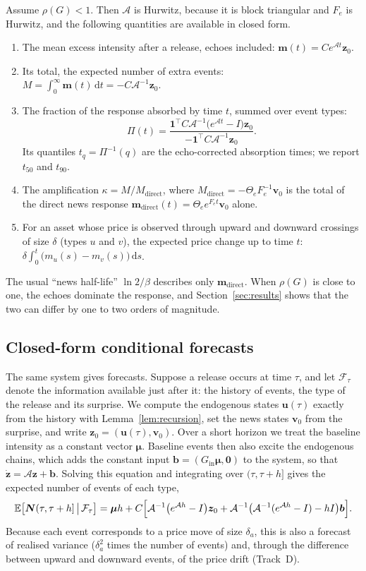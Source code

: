 \begin{corollary}\label{cor:abs}
Assume $\rho(G)<1$. Then $\mathcal A$ is Hurwitz, because it is block triangular and $F_e$ is
Hurwitz, and the following quantities are available in closed form.
\begin{enumerate}
\item The mean excess intensity after a release, echoes included: $\bm m(t)=Ce^{\mathcal At}\bm z_0$.
\item Its total, the expected number of extra events: $M=\int_0^\infty\bm m(t)\,\mathrm{d}t=-C\mathcal A^{-1}\bm z_0$.
\item The fraction of the response absorbed by time $t$, summed over event types:
\[
\Pi(t)=\frac{\bm 1^\top C\mathcal A^{-1}\bigl(e^{\mathcal At}-I\bigr)\bm z_0}{-\bm 1^\top C\mathcal A^{-1}\bm z_0}.
\]
Its quantiles $t_q=\Pi^{-1}(q)$ are the echo-corrected absorption times; we report $t_{50}$ and $t_{90}$.
\item The amplification $\kappa=M/M_{\mathrm{direct}}$, where $M_{\mathrm{direct}}=-\Theta_eF_e^{-1}\bm v_0$
is the total of the direct news response $\bm m_{\mathrm{direct}}(t)=\Theta_e e^{F_et}\bm v_0$ alone.
\item For an asset whose price is observed through upward and downward crossings of size $\delta$
(types $u$ and $v$), the expected price change up to time $t$:
$\delta\int_0^t\bigl(m_u(s)-m_v(s)\bigr)\,\mathrm{d}s$.
\end{enumerate}
\end{corollary}

The usual ``news half-life'' $\ln 2/\beta$ describes only $\bm m_{\mathrm{direct}}$. When $\rho(G)$
is close to one, the echoes dominate the response, and Section~\ref{sec:results} shows that
the two can differ by one to two orders of magnitude.

\subsection{Closed-form conditional forecasts}
The same system gives forecasts. Suppose a release occurs at time $\tau$, and let
$\mathcal F_\tau$ denote the information available just after it: the history of events, the type
of the release and its surprise. We compute the endogenous states $\bm u(\tau)$ exactly from the
history with Lemma~\ref{lem:recursion}, set the news states $\bm v_0$ from the surprise, and write
$\bm z_0=(\bm u(\tau),\bm v_0)$. Over a short horizon we treat the baseline intensity as a constant
vector $\bm\mu$. Baseline events then also excite the endogenous chains, which adds the constant
input $\bm b=(G_{\mathrm{in}}\bm\mu,\bm 0)$ to the system, so that
$\dot{\bm z}=\mathcal A\bm z+\bm b$. Solving this equation and integrating over $(\tau,\tau+h]$ gives the
expected number of events of each type,
\[
\mathbb{E}\bigl[\bm N(\tau,\tau+h]\,\big|\,\mathcal F_\tau\bigr]
=\bm\mu h+C\Bigl[\mathcal A^{-1}\bigl(e^{\mathcal Ah}-I\bigr)\bm z_0
+\mathcal A^{-1}\bigl(\mathcal A^{-1}(e^{\mathcal Ah}-I)-hI\bigr)\bm b\Bigr].
\]
Because each event corresponds to a price move of size $\delta_a$, this is also a forecast of
realised variance ($\delta_a^2$ times the number of events) and, through the difference between
upward and downward events, of the price drift (Track~D).
